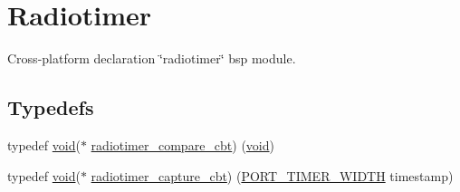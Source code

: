 \hypertarget{group__radiotimer}{}\section{Radiotimer}
\label{group__radiotimer}


Cross-\/platform declaration \char`\"{}radiotimer\char`\"{} bsp module.  


\subsection*{Typedefs}
\begin{DoxyCompactItemize}
\item 
typedef \hyperlink{usb__devapi_8h_afabf60e7f57651d6d595a02c75f07cd0}{void}($\ast$ \hyperlink{group__radiotimer_ga62b602325e65023c91b784f20cd2d6bc}{radiotimer\+\_\+compare\+\_\+cbt}) (\hyperlink{usb__devapi_8h_afabf60e7f57651d6d595a02c75f07cd0}{void})
\item 
typedef \hyperlink{usb__devapi_8h_afabf60e7f57651d6d595a02c75f07cd0}{void}($\ast$ \hyperlink{group__radiotimer_gac7da641d0774aa21bfabefd560e42acf}{radiotimer\+\_\+capture\+\_\+cbt}) (\hyperlink{z1_2board__info_8h_abe66b9c1c60db84f2a99f2b827275f24}{P\+O\+R\+T\+\_\+\+T\+I\+M\+E\+R\+\_\+\+W\+I\+D\+TH} timestamp)
\end{DoxyCompactItemize}
